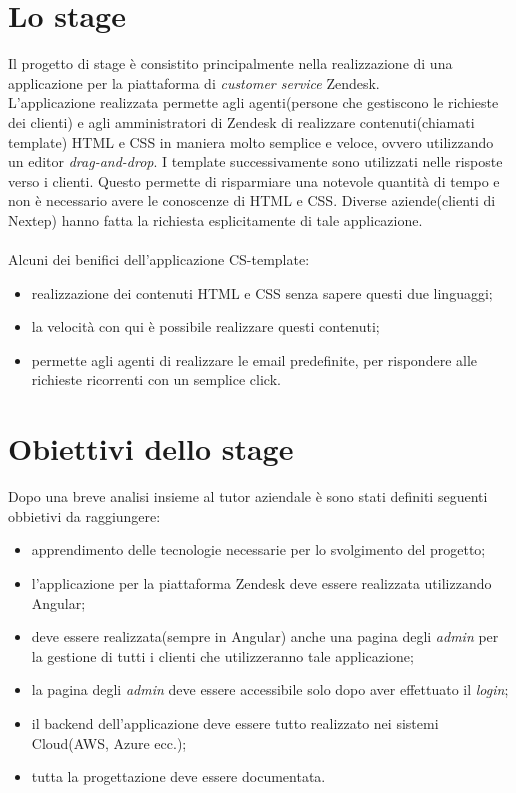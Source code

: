 \section{Lo stage}
Il progetto di stage è consistito principalmente nella realizzazione di una applicazione per la piattaforma di \emph{customer service} Zendesk. \\ L'applicazione realizzata permette agli agenti(persone che gestiscono le richieste dei clienti) e agli amministratori di Zendesk di realizzare contenuti(chiamati template) HTML e CSS in maniera molto semplice e veloce, ovvero utilizzando un editor \emph{drag-and-drop}. I template successivamente sono utilizzati nelle risposte verso i clienti. Questo permette di risparmiare una notevole quantità di tempo e non è necessario avere le conoscenze di HTML e CSS. Diverse aziende(clienti di Nextep) hanno fatta la richiesta esplicitamente di tale applicazione.
\\
\\
Alcuni dei benifici dell'applicazione CS-template:
\begin{itemize}
	\item realizzazione dei contenuti HTML e CSS senza sapere questi due linguaggi;
	\item la velocità con qui è possibile realizzare questi contenuti;
	\item permette agli agenti di realizzare le email predefinite, per rispondere alle richieste ricorrenti con un semplice click.
\end{itemize}
\newpage
\section{ Obiettivi dello stage}
Dopo una breve analisi insieme al tutor aziendale è sono stati definiti  seguenti obbietivi da raggiungere: 
\begin{itemize}
	\item apprendimento delle tecnologie necessarie per lo svolgimento del progetto;
	\item l'applicazione per la piattaforma Zendesk deve essere realizzata utilizzando Angular; 
	\item deve essere realizzata(sempre in Angular) anche una pagina degli \emph{admin} per la gestione di tutti i clienti che utilizzeranno tale applicazione;
	\item la pagina degli \emph{admin} deve essere accessibile solo dopo aver effettuato il \emph{login};
	\item il backend dell'applicazione deve essere tutto realizzato nei sistemi Cloud(AWS, Azure ecc.);
	\item tutta la progettazione deve essere documentata.
\end{itemize} 

